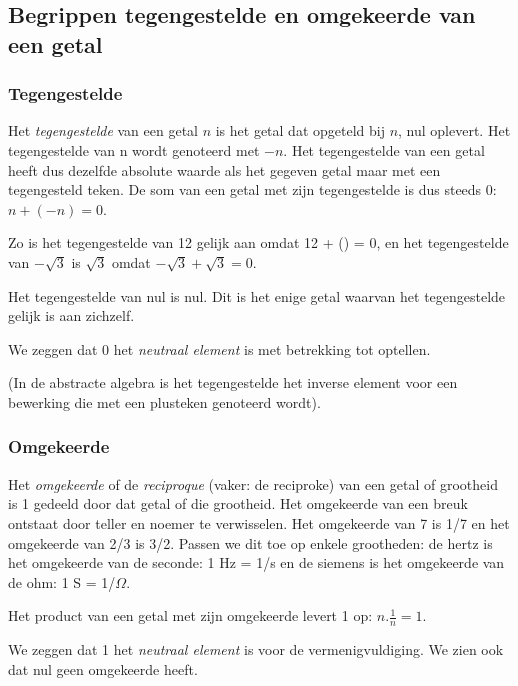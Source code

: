 \subsection{Begrippen tegengestelde en omgekeerde van een getal}

\subsubsection{Tegengestelde}

Het \emph{tegengestelde} van een getal $n$ is het getal dat opgeteld
bij $n$, nul oplevert. Het tegengestelde van n wordt genoteerd met
$-n$. Het tegengestelde van een getal heeft dus dezelfde absolute
waarde als het gegeven getal maar met een tegengesteld teken. De som
van een getal met zijn tegengestelde is dus steeds 0: $n+(-n)=0$.

\noindent Zo is het tegengestelde van 12 gelijk aan 
omdat 12 + () = 0, en het tegengestelde van $-\sqrt{3}$
is $\sqrt{3}$ omdat $-\sqrt{3}+\sqrt{3}=0$.

\medskip{}


\noindent Het tegengestelde van nul is nul. Dit is het enige getal
waarvan het tegengestelde gelijk is aan zichzelf. 

\noindent We zeggen dat 0 het \emph{neutraal element} is met betrekking
tot optellen.

\noindent (In de abstracte algebra is het tegengestelde het inverse
element voor een bewerking die met een plusteken genoteerd wordt).

\bigskip{}

\subsubsection{Omgekeerde}

\noindent Het \emph{omgekeerde} of de \emph{reciproque} (vaker: de
reciproke) van een getal of grootheid is 1 gedeeld door dat getal
of die grootheid. Het omgekeerde van een breuk ontstaat door teller
en noemer te verwisselen. Het omgekeerde van 7 is 1/7 en het omgekeerde
van 2/3 is 3/2. Passen we dit toe op enkele grootheden: de hertz is
het omgekeerde van de seconde: 1 Hz = 1/s en de siemens is het omgekeerde
van de ohm: 1 S = 1/$\Omega$.

\noindent Het product van een getal met zijn omgekeerde levert 1 op:
${\displaystyle n.\frac{1}{n}=1}$. 

\noindent We zeggen dat 1 het \emph{neutraal element} is voor de vermenigvuldiging.
We zien ook dat nul geen omgekeerde heeft.

